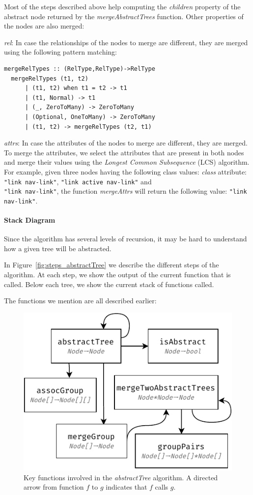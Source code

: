 Most of the steps described above help computing the \emph{children} property of the abstract node returned by the \emph{mergeAbstractTrees} function.
Other properties of the nodes are also merged: 
\begin{compactdesc}
\item[\emph{rel}:] In case the relationships of the nodes to merge are different, they are merged using the following pattern matching:
\begin{lstlisting}[basicstyle=\small]
  mergeRelTypes :: (RelType,RelType)->RelType
  mergeRelTypes (t1, t2)
      | (t1, t2) when t1 = t2 -> t1
      | (t1, Normal) -> t1
      | (_, ZeroToMany) -> ZeroToMany
      | (Optional, OneToMany) -> ZeroToMany
      | (t1, t2) -> mergeRelTypes (t2, t1)
\end{lstlisting}

\item[\emph{attrs}:] In case the attributes of the nodes to merge are different, they are merged.
To merge the attributes, we select the attributes that are present in both nodes and merge their values using the \emph{Longest Common Subsequence} (LCS) algorithm.
For example, given three nodes having the following class values:  \emph{class} attribute: \lstinline{"link nav-link"}, \lstinline{"link active nav-link"} and \\\lstinline{"link nav-link"}, the function \emph{mergeAttrs}  will return the following value: \lstinline{"link nav-link"}.
\end{compactdesc}

\paragraph{Stack Diagram}
Since the algorithm has several levels of recursion, it may be hard to understand how a given tree will be abstracted. 

In Figure~\ref{fig:steps_abstractTree} we describe the different steps of the algorithm.
At each step, we show the output of the current function that is called.
Below each tree, we show the current stack of functions called.

The functions we mention are all described earlier:
\begin{figure}[]
  \centering
  \includegraphics[width=0.7\linewidth]{appstract/explanations/functions_relations}
  \caption{Key functions involved in the \emph{abstractTree} algorithm. A directed arrow from function $f$ to $g$ indicates that $f$ calls $g$.}
  \label{fig:functions_relations}
\end{figure}

